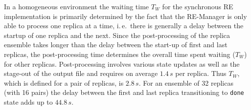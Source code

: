 \documentclass{rspublic}
\newcommand{\alnote}[1]{ {\textcolor{blue} { ***andre: #1 }}}
\newcommand{\athotanote}[1]{ {\textcolor{green} { ***athota: #1 }}}
\newcommand{\alnote}[1]{}
\newcommand{\athotanote}[1]{}
\begin{document}

In a homogeneous environment the waiting time $T_{W}$ for the synchronous RE 
implementation is primarily determined by the fact that the RE-Manager
is only able to process one replica at a time, i.\,e.\ there is generally 
a delay between the startup of one replica and the next. Since the post-processing 
of the replica ensemble takes longer than the delay between the start-up of first 
and last replicas, the post-processing time determines the overall time 
spent waiting ($T_W$) for other replicas.
Post-processing involves various state updates as well as the stage-out of
the output file and requires on average $1.4\,s$ per replica.
Thus $T_{W}$, which is defined for a pair of replicas, is $2.8\,s$. 
For an ensemble of 32 replicas (with 16 pairs) the delay between the first and last replica
transitioning to \texttt{done} state adds up to $44.8\,s$.  






\end{document}

